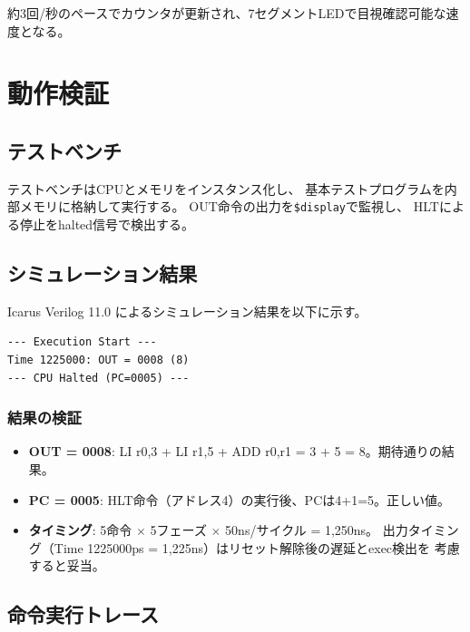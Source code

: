\documentclass[a4paper,11pt]{ltjsarticle}
\begin{document}
約3回/秒のペースでカウンタが更新され、7セグメントLEDで目視確認可能な速度となる。


\section{動作検証}

\subsection{テストベンチ}



テストベンチはCPUとメモリをインスタンス化し、
基本テストプログラムを内部メモリに格納して実行する。
OUT命令の出力を\texttt{\$display}で監視し、
HLTによる停止をhalted信号で検出する。

\subsection{シミュレーション結果}

Icarus Verilog 11.0 によるシミュレーション結果を以下に示す。

\begin{lstlisting}[language={},frame=single,caption={シミュレーション出力}]
--- Execution Start ---
Time 1225000: OUT = 0008 (8)
--- CPU Halted (PC=0005) ---
\end{lstlisting}

\subsubsection{結果の検証}

\begin{itemize}
\item \textbf{OUT = 0008}: LI r0,3 + LI r1,5 + ADD r0,r1 = 3 + 5 = 8。期待通りの結果。
\item \textbf{PC = 0005}: HLT命令（アドレス4）の実行後、PCは4+1=5。正しい値。
\item \textbf{タイミング}: 5命令 $\times$ 5フェーズ $\times$ 50ns/サイクル = 1,250ns。
  出力タイミング（Time 1225000ps = 1,225ns）はリセット解除後の遅延とexec検出を
  考慮すると妥当。
\end{itemize}

\subsection{命令実行トレース}
\end{document}
